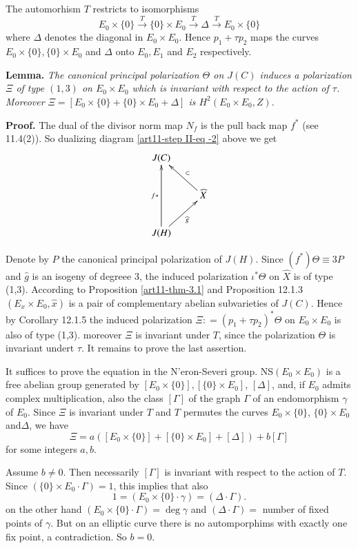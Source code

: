 The automorhism $T$ restricts to isomorphisms
$$
E_{0} \times \{0\} \xrightarrow{T}\{0\} \times E_{0} \xrightarrow{T}\Delta\xrightarrow{T} E_{0} \times \{0\}
$$ 
where $\Delta$ denotes the diagonal in $E_{0}\times E_{0}$. Hence $p_{1} + \tau p_{2}$ maps the curves $E_{0}\times \{0\}, \{0\} \times E_{0}$ and $\Delta$ onto $E_{0}, E_{1}$ and $E_{2}$ respectively.

\medskip
\noindent
{\bfseries {} Lemma.\label{art11-lemma-5.4}} \textit{The canonical principal polarization $\Theta$ on $J(C)$ induces a polarization $\Xi$ of type $(1,3)$ on $E_{0} \times E_{0}$ which is invariant with respect to the action of $\tau$.
 Moreover $\Xi =[E_{0}\times \{0\} + \{0\} \times E_{0}+ \Delta]$ is $H^{2}(E_{0}\times E_{0}, Z)$}.

 \medskip
\noindent
{\bfseries Proof.} The dual of the divisor norm map $N_{f}$ is the pull back map $f^{*}$
(see \cite{art11-keyL-B} 11.4(2)). So dualizing diagram \eqref{art11-step II-eq -2} above we get
$$
\xymatrix{
J(C) & \\
    &\widehat{X} \ar[ul]_-{\subset}\\
J(H) \ar[ur]_-{\widehat{g}}\ar[uu]^-{f*} &     
}
$$

Denote by $P$ the canonical principal polarization of $J(H)$. Since $(f^{*}) \Theta \equiv 3P$ and $\widehat{g}$ is an isogeny of degreee 3, the induced polarization $\iota^{*}\Theta$ on $\widehat{X}$ is of type (1,3). According to Proposition \ref{art11-thm-3.1} and \cite{art11-keyL-B} Proposition 12.1.3 $(E_{x} \times E_{0}, \widehat{x})$ is a pair of complementary abelian subvarieties of $J(C)$. Hence by \cite{art11-keyL-B} Corollary 12.1.5 the induced polarization
$\Xi : = (p_{1} + \tau p_{2})^{*}\Theta$ on $E_{0} \times E_{0}$ is also of type (1,3). moreover $\Xi$ is invariant under $T$, since the polarization $\Theta$ is invariant undert $\tau$. It remains to prove the last assertion.

It suffices to prove the equation in the N'eron-Severi group. NS$(E_{0}\times E_{0})$ is a free abelian group generated by $[E_{0} \times \{0\}],[\{0\} \times E_{0}]$, $[\Delta]$, and, if $E_{0}$ admits complex multiplication, also the class $[\Gamma]$  of the graph $\Gamma$ of an endomorphism $\gamma$ of $E_{0}$. Since $\Xi$ is invariant under $T$ and $T$ permutes the curves $E_{0} \times \{0\}$, $\{0\}\times E_{0}$ and$ \Delta$, we have
$$
\Xi = a([E_{0} \times \{0\}] + [\{0\} \times E_{0}] + [\Delta]) +b[\Gamma]
$$
for some integers $a,b$.

Assume $b\neq 0$. Then necessarily $[\Gamma]$ is invariant with respect to the action of $T$. Since $(\{0\} \times E_{0}\cdot \Gamma)=1$, this implies that also
$$
1 =(E_{0}\times \{0\}\cdot \gamma)=(\Delta \cdot \Gamma).
$$
on the other hand $(E_{0} \times \{0\}\cdot \Gamma)=\deg \gamma$ and  $(\Delta \cdot \Gamma)=$ number of fixed points of $\gamma$. But on an elliptic curve there is no automporphims with exactly one fix point, a contradiction. So $b=0$.

